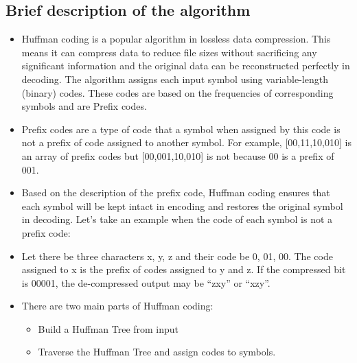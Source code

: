 \subsection{Brief description of the algorithm}
\begin{itemize}
\item Huffman coding is a popular algorithm in lossless data compression. This means it can compress data to reduce file sizes without sacrificing any significant information and the original data can be reconstructed perfectly in decoding. 
The algorithm assigns each input symbol using variable-length (binary) codes. These codes are based on the frequencies of corresponding symbols and are Prefix codes.  
\item Prefix codes are a type of code that a symbol when assigned by this code is not a prefix of code assigned to another symbol. For example, [00,11,10,010] is an array of prefix codes but [00,001,10,010] is not because 00 is a prefix of 001.
\item Based on the description of the prefix code, Huffman coding ensures that each symbol will be kept intact in encoding and restores the original symbol in decoding. Let's take an example when the code of each symbol is not a prefix code: \item Let there be three characters x, y, z and their code be 0, 01, 00. The code assigned to x is the prefix of codes assigned to y and z. If the compressed bit is 00001, the de-compressed output may be “zxy” or “xzy”.
\item There are two main parts of Huffman coding:
\begin{itemize}
    \item Build a Huffman Tree from input
    \item Traverse the Huffman Tree and assign codes to symbols.
\end{itemize}
\end{itemize}
